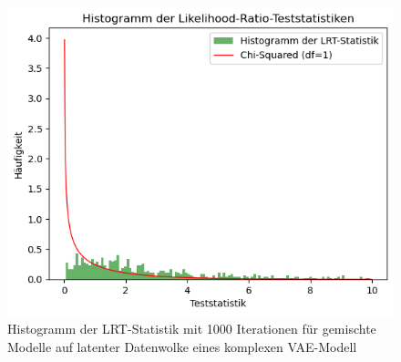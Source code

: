 \documentclass[%
thesis=student,%
coverpage=false,%
titlepage=false,%
headmarks=true, %
german,%
font=libertine, %
math=newpxtx, %
BCOR=5mm,%
coverBCOR=11mm%
]{tumbook}
\theoremstyle{break}
\begin{document}
\\
\begin{figure}[H]
	\centering
	\includegraphics[scale=0.6]{plots/4_latent_dim_VAE.png}
	\caption{Histogramm der LRT-Statistik mit 1000 Iterationen für gemischte Modelle auf latenter Datenwolke eines komplexen VAE-Modell}
	\label{fig:HIST_4latentdim}
\end{figure}
\end{document}
